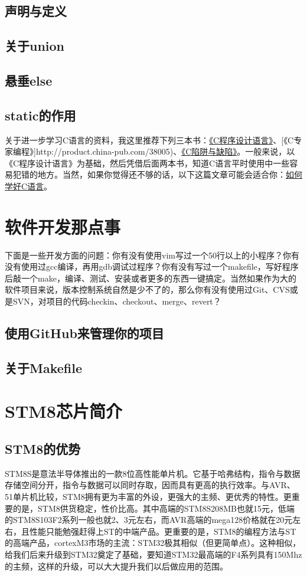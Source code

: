 \documentclass[a4paper]{book}
\newcommand{\chap}[1]{\newpage\thispagestyle{empty}\chapter{#1}\label{chap:\thechapter}}
\begin{document}
\section{声明与定义}

\section{关于union}

\section{悬垂else}

\section{static的作用}

关于进一步学习C语言的资料，我这里推荐下列三本书：\href{http://product.china-pub.com/14975\&ref=browse}{《C程序设计语言》}、{[}《C专家编程》{]}http://product.china-pub.com/38005)、\href{http://product.china-pub.com/38125}{《C陷阱与缺陷》}。一般来说，以《C程序设计语言》为基础，然后凭借后面两本书，知道C语言平时使用中一些容易犯错的地方。当然，如果你觉得还不够的话，以下这篇文章可能会适合你：\href{http://coolshell.cn/articles/4102.html}{如何学好C语言}。

\chap{软件开发那点事}

下面是一些开发方面的问题：你有没有使用vim写过一个50行以上的小程序？你有没有使用过gcc编译，再用gdb调试过程序？你有没有写过一个makefile，写好程序后敲一个make，编译、测试、安装或者更多的东西一键搞定。当然如果作为大的软件项目来说，版本控制系统自然是少不了的，那么你有没有使用过Git、CVS或是SVN，对项目的代码checkin、checkout、merge、revert？

\section{使用GitHub来管理你的项目}

\section{关于Makefile}

\chap{STM8芯片简介}

\section{STM8的优势}

STM8S是意法半导体推出的一款8位高性能单片机。它基于哈弗结构，指令与数据存储空间分开，指令与数据可以同时存取，因而具有更高的执行效率。与AVR、51单片机比较，STM8拥有更为丰富的外设，更强大的主频、更优秀的特性。更重要的是，STM8供货稳定，性价比高。其中高端的STM8S208MB也就15元，低端的STM8S103F2系列一般也就2、3元左右，而AVR高端的mega128价格就在20元左右，且性能只能勉强赶得上ST的中端产品。更重要的是，STM8的编程方法与ST的高端产品，cortexM3市场的主流：STM32极其相似（但更简单点）。这种相似，给我们后来升级到STM32奠定了基础，要知道STM32最高端的F4系列具有150Mhz的主频，这样的升级，可以大大提升我们以后做应用的范围。
\end{document}
